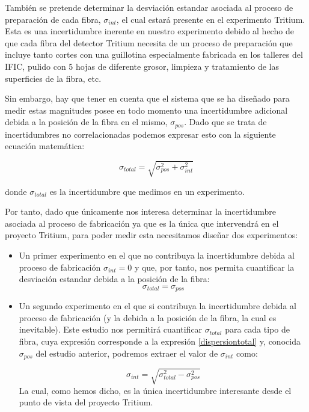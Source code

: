 También se pretende determinar la desviación estandar asociada al proceso de preparación de cada fibra, $\sigma_{int}$, el cual estará presente en el experimento Tritium. Esta es una incertidumbre inerente en nuestro experimento debido al hecho de que cada fibra del detector Tritium necesita de un proceso de preparación que incluye tanto cortes con una guillotina especialmente fabricada en los talleres del IFIC, pulido con 5 hojas de diferente grosor, limpieza y tratamiento de las superficies de la fibra, etc. 

Sin embargo, hay que tener en cuenta que el sistema que se ha diseñado para medir estas magnitudes posee en todo momento una incertidumbre adicional debida a la posición de la fibra en el mismo, $\sigma_{pos}$. Dado que se trata de incertidumbres no correlacionadas podemos expresar esto con la siguiente ecuación matemática:

\begin{equation}
\sigma_{total}=\sqrt{\sigma_{pos}^2+\sigma_{int}^2}
\label{dispersiontotal}
\end{equation}

donde $\sigma_{total}$ es la incertidumbre que medimos en un experimento.

Por tanto, dado que únicamente nos interesa determinar la incertidumbre asociada al proceso de fabricación ya que es la única que intervendrá en el proyecto Tritium, para poder medir esta necesitamos diseñar dos experimentos:
\begin{itemize}
\item{} Un primer experimento en el que no contribuya la incertidumbre debida al proceso de fabricación $\sigma_{int}=0$ y que, por tanto, nos permita cuantificar la desviación estandar debida a la posición de la fibra:
$$\sigma_{total}=\sigma_{pos}$$
\item{} Un segundo experimento en el que si contribuya la incertidumbre debida al proceso de fabricación (y la debida a la posición de la fibra, la cual es inevitable). Este estudio nos permitirá cuantificar $\sigma_{total}$ para cada tipo de fibra, cuya expresión corresponde a la expresión \ref{dispersiontotal} y, conocida $\sigma_{pos}$ del estudio anterior, podremos extraer el valor de $\sigma_{int}$ como:

\begin{equation}
\sigma_{int}=\sqrt{\sigma_{total}^2-\sigma_{pos}^2}
\label{incertidumbreint}
\end{equation}
La cual, como hemos dicho, es la única incertidumbre interesante desde el punto de vista del proyecto Tritium.
\end{itemize}
